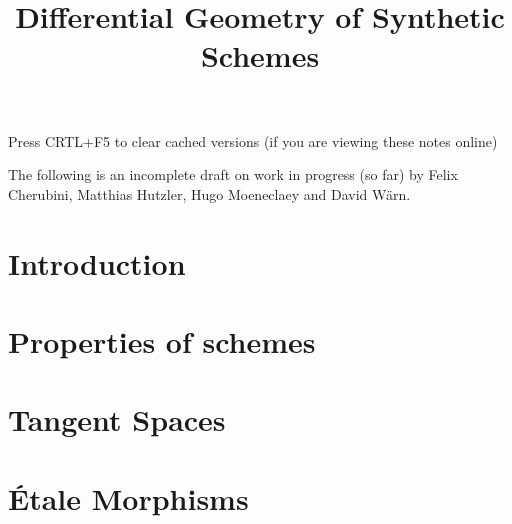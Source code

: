 \documentclass{../util/zariski}
\title{Differential Geometry of Synthetic Schemes}
\begin{document}
\maketitle

\begin{center}
  \color{purple}
  \large{Press CRTL+F5 to clear cached versions}
  \large{(if you are viewing these notes online)}
\end{center}

The following is an incomplete draft on work in progress (so far)
by Felix Cherubini, Matthias Hutzler, Hugo Moeneclaey and David Wärn.

\tableofcontents

\section*{Introduction}


\section{Properties of schemes}


\section{Tangent Spaces}



\section{Étale Morphisms}


\printindex

\printbibliography
\end{document}
